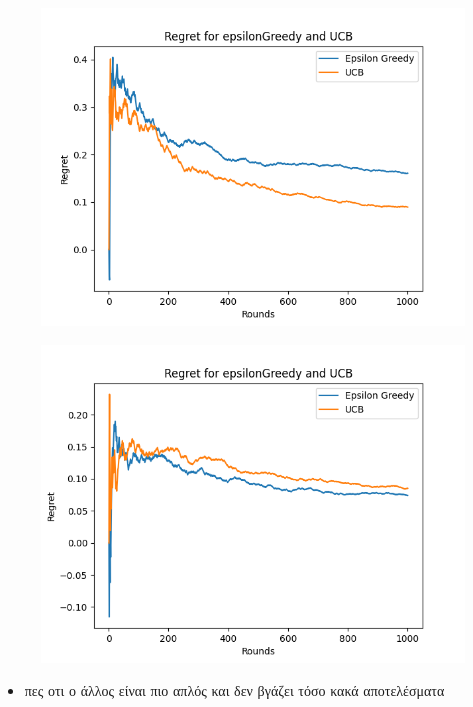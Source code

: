 \begin{figure}[h]
	\centering
	\begin{minipage}{.5\textwidth}
	  \centering
	  \includegraphics[width=.8\linewidth]{Images/regret_1000_UCB.png}
	  \label{fig:epsilon_1000}
	\end{minipage}%
	\begin{minipage}{.5\textwidth}
	  \centering
	  \includegraphics[width=.8\linewidth]{Images/regret_1000_epsilon.png}
	  \label{fig:UCB_1000}
	\end{minipage}
	\end{figure}

\clearpage



\begin{itemize}
	\item πες οτι ο άλλος είναι πιο απλός και δεν βγάζει τόσο κακά αποτελέσματα
\end{itemize}